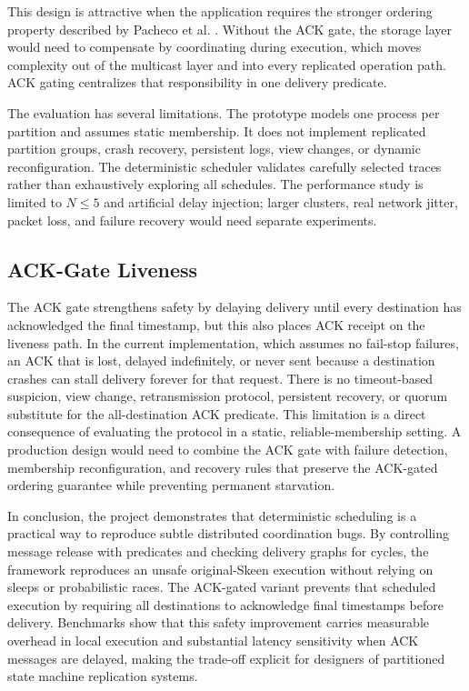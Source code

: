 \documentclass[conference]{IEEEtran}
\begin{document}
This design is attractive when the application requires the stronger ordering property described by Pacheco et al. \cite{pacheco}. Without the ACK gate, the storage layer would need to compensate by coordinating during execution, which moves complexity out of the multicast layer and into every replicated operation path. ACK gating centralizes that responsibility in one delivery predicate.

The evaluation has several limitations. The prototype models one process per partition and assumes static membership. It does not implement replicated partition groups, crash recovery, persistent logs, view changes, or dynamic reconfiguration. The deterministic scheduler validates carefully selected traces rather than exhaustively exploring all schedules. The performance study is limited to $N \leq 5$ and artificial delay injection; larger clusters, real network jitter, packet loss, and failure recovery would need separate experiments.

\subsection{ACK-Gate Liveness}

The ACK gate strengthens safety by delaying delivery until every destination has acknowledged the final timestamp, but this also places ACK receipt on the liveness path. In the current implementation, which assumes no fail-stop failures, an ACK that is lost, delayed indefinitely, or never sent because a destination crashes can stall delivery forever for that request. There is no timeout-based suspicion, view change, retransmission protocol, persistent recovery, or quorum substitute for the all-destination ACK predicate. This limitation is a direct consequence of evaluating the protocol in a static, reliable-membership setting. A production design would need to combine the ACK gate with failure detection, membership reconfiguration, and recovery rules that preserve the ACK-gated ordering guarantee while preventing permanent starvation.

In conclusion, the project demonstrates that deterministic scheduling is a practical way to reproduce subtle distributed coordination bugs. By controlling message release with predicates and checking delivery graphs for cycles, the framework reproduces an unsafe original-Skeen execution without relying on sleeps or probabilistic races. The ACK-gated variant prevents that scheduled execution by requiring all destinations to acknowledge final timestamps before delivery. Benchmarks show that this safety improvement carries measurable overhead in local execution and substantial latency sensitivity when ACK messages are delayed, making the trade-off explicit for designers of partitioned state machine replication systems.
\end{document}
